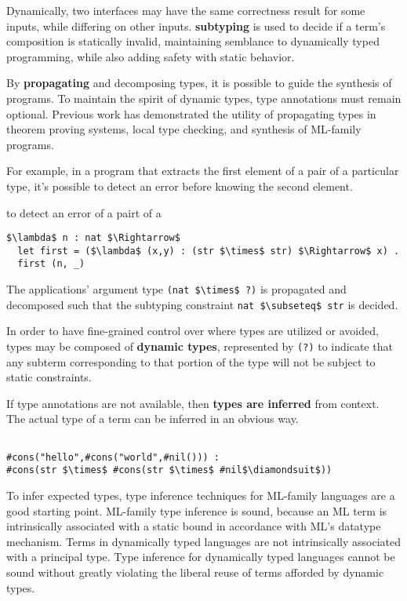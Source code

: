 \documentclass[sigplan,screen]{acmart}
\begin{document}
Dynamically, two interfaces may have the same correctness result for some inputs,
while differing on other inputs. \textbf{subtyping} is used to decide if a term's 
composition is statically invalid, maintaining semblance to dynamically typed programming,
while also adding safety with static behavior.

By \textbf{propagating} and decomposing types, 
it is possible to guide the synthesis of programs.
To maintain the spirit of dynamic types, type annotations must remain optional.
Previous work has demonstrated the utility of propagating types 
in theorem proving systems, local type checking, 
and synthesis of ML-family programs.

For example, in a program that extracts 
the first element of a pair of a particular type, 
it's possible to detect an error before knowing the second element.

to detect an error of a pairt of a   
\begin{lstlisting}
$\lambda$ n : nat $\Rightarrow$
  let first = ($\lambda$ (x,y) : (str $\times$ str) $\Rightarrow$ x) .
  first (n, _) 
\end{lstlisting}

\noindent The  applications' argument type \lstinline{(nat $\times$ ?)} 
is propagated and decomposed such that the subtyping constraint 
\lstinline{nat $\subseteq$ str} is decided. 

In order to have fine-grained control over where types are utilized or avoided, 
types may be composed of \textbf{dynamic types}, represented by \lstinline{(?)} to indicate 
that any subterm corresponding to that portion of the type 
will not be subject to static constraints.

If type annotations are not available, then \textbf{types are inferred} from context. 
The actual type of a term can be inferred in an obvious way.  

\begin{lstlisting}

#cons("hello",#cons("world",#nil())) : 
#cons(str $\times$ #cons(str $\times$ #nil$\diamondsuit$))

\end{lstlisting}

To infer expected types, type inference techniques for ML-family languages 
are a good starting point.
ML-family type inference is sound, because an ML term is 
intrinsically associated with a static bound in accordance with ML's datatype mechanism.
Terms in dynamically typed languages are not intrinsically associated with a principal type. 
Type inference for dynamically typed languages cannot be sound without greatly violating the 
liberal reuse of terms afforded by dynamic types. 
\end{document}

